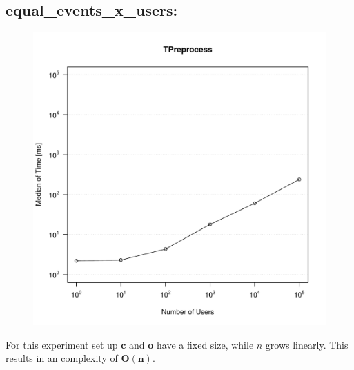 \documentclass[10pt,a4paper]{article}
\begin{document}
	\subsection{equal\_events\_x\_users:}
	\begin{figure}[H]
		\centering
		\includegraphics[scale=0.7]{graphics/TPreprocess_median_equal_events_ms.pdf}
	\end{figure}
	For this experiment set up $\mathbf{c}$ and $\mathbf{o}$ have a fixed size, while $n$ grows linearly. This results in an complexity of $\mathbf{O(n)}$.
	
\end{document}
